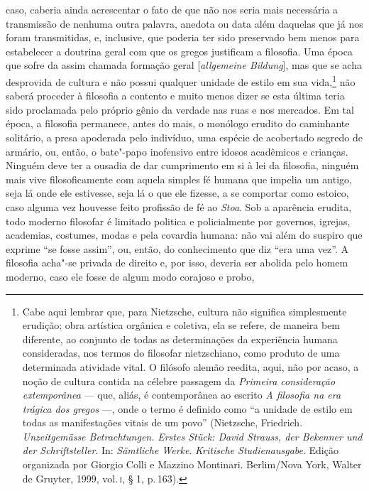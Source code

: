  caso, caberia ainda acrescentar o fato de que não nos seria mais necessária
 a transmissão de nenhuma outra palavra, anedota ou data além daquelas que já
 nos foram transmitidas, e, inclusive, que poderia ter sido preservado bem
 menos para estabelecer a doutrina geral com que os gregos justificam a
 filosofia. Uma época que sofre da assim chamada formação geral [\textit{allgemeine Bildung}], 
 mas que se acha desprovida de cultura e não possui qualquer unidade 
 de estilo em sua vida,\footnote{Cabe aqui lembrar que, para Nietzsche, 
 cultura não significa simplesmente erudição; obra artística orgânica e 
 coletiva, ela se refere, de maneira bem diferente, ao conjunto de
 todas as determinações da experiência humana consideradas, nos termos do
 filosofar nietzschiano, como produto de uma determinada atividade vital. O
 filósofo alemão reedita, aqui, não por acaso, a noção de cultura contida na
 célebre passagem da \textit{Primeira consideração extemporânea} --- que,
 aliás, é contemporânea ao escrito \textit{A filosofia na era trágica dos
 gregos} ---, onde o termo é definido como ``a unidade de estilo em todas as
 manifestações vitais de um povo'' (Nietzsche, Friedrich. \textit{Unzeitgemässe 
 Betrachtungen.} \textit{Erstes Stück: David Strauss, der
 Bekenner und der Schriftsteller}. In: \textit{Sämtliche Werke}. 
 \textit{Kritische Studienausgabe}. Edição organizada por Giorgio Colli e 
 Mazzino Montinari. Berlim/Nova York, Walter de Gruyter, 1999, vol.\,\textsc{i}, 
 § 1, p.\,163).} não saberá proceder à filosofia a contento e muito menos dizer 
 se esta última teria sido proclamada pelo próprio gênio da verdade nas ruas 
 e nos mercados. Em tal época, a filosofia permanece, antes do mais, o monólogo 
 erudito do caminhante solitário, a presa apoderada pelo indivíduo, uma espécie 
 de acobertado segredo de armário, ou, então, o bate"-papo inofensivo entre idosos 
 acadêmicos e crianças. Ninguém deve ter a ousadia de dar cumprimento em si à lei da
 filosofia, ninguém mais vive filosoficamente com aquela simples fé humana
 que impelia um antigo, seja lá onde ele estivesse, seja lá o que ele
 fizesse, a se comportar como estoico, caso alguma vez houvesse feito
 profissão de fé ao \textit{Stoa}. Sob a aparência erudita, todo moderno
 filosofar é limitado politica e policialmente por governos, igrejas,
 academias, costumes, modas e pela covardia humana: não vai além do suspiro
 que exprime ``se fosse assim'', ou, então, do conhecimento que diz ``era uma
 vez''. A filosofia acha"-se privada de direito e, por isso, deveria ser
 abolida pelo homem moderno, caso ele fosse de algum modo corajoso e probo,
